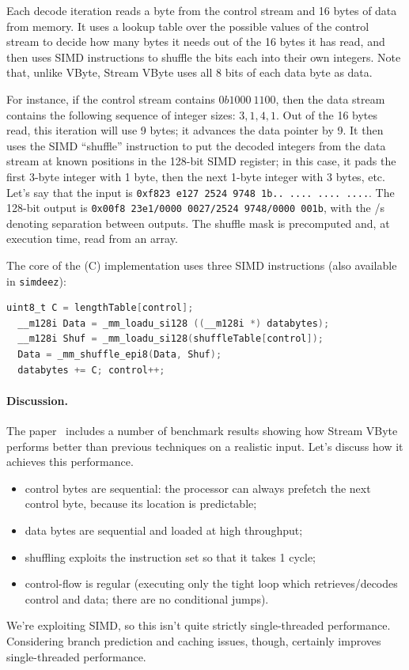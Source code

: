 \documentclass[a4paper]{report}
\newcommand{\CPP}{C\nolinebreak\hspace{-.05em}\raisebox{.4ex}{\tiny\bf +}\nolinebreak\hspace{-.10em}\raisebox{.4ex}{\tiny\bf +}}
\def\CPP{{C\nolinebreak[4]\hspace{-.05em}\raisebox{.4ex}{\tiny\bf ++}}}
\begin{document}
Each decode iteration reads a byte from the control stream and 16 bytes of data from memory.
It uses a lookup table over the possible values of the control stream to decide how many
bytes it needs out of the 16 bytes it has read, and then uses SIMD instructions to shuffle
the bits each into their own integers. Note that, unlike VByte, Stream VByte uses all 8 bits
of each data byte as data.

For instance, if the control stream contains $0b1000~1100$, then the data stream
contains the following sequence of integer sizes: $3, 1, 4, 1$. Out of the 16 bytes read,
this iteration will use 9 bytes; it advances the data pointer by 9. It then uses the SIMD
``shuffle'' instruction to put the decoded integers from the data stream at known positions in the
128-bit SIMD register; in this case, it pads the first 3-byte integer with 1 byte, then
the next 1-byte integer with 3 bytes, etc. Let's say that the input is
{\tt 0xf823~e127~2524~9748~1b..~....~....~....}. The 128-bit output is
{\tt 0x00f8~23e1/0000~0027/2524 9748/0000~001b}, with the /s denoting separation
between outputs. The shuffle mask is precomputed and, at
execution time, read from an array.

The core of the (\CPP) implementation uses three SIMD instructions (also available in \texttt{simdeez}):
\begin{lstlisting}[language=C]
  uint8_t C = lengthTable[control];
  __m128i Data = _mm_loadu_si128 ((__m128i *) databytes);
  __m128i Shuf = _mm_loadu_si128(shuffleTable[control]);
  Data = _mm_shuffle_epi8(Data, Shuf);
  databytes += C; control++;
\end{lstlisting}

\paragraph{Discussion.} The paper~\cite{LEMIRE20181} includes a number of benchmark results
showing how Stream VByte performs better than previous techniques on a realistic input.
Let's discuss how it achieves this performance.

\begin{itemize}[noitemsep]
\item control bytes are sequential: the processor can always prefetch the next control byte, because
its location is predictable;
\item data bytes are sequential and loaded at high throughput;
\item shuffling exploits the instruction set so that it takes 1 cycle;
\item control-flow is regular (executing only the tight loop which retrieves/decodes control
and data; there are no conditional jumps).
\end{itemize}
We're exploiting SIMD, so this isn't quite strictly single-threaded performance.
Considering branch prediction and caching issues, though,
certainly improves single-threaded performance.
\end{document}
